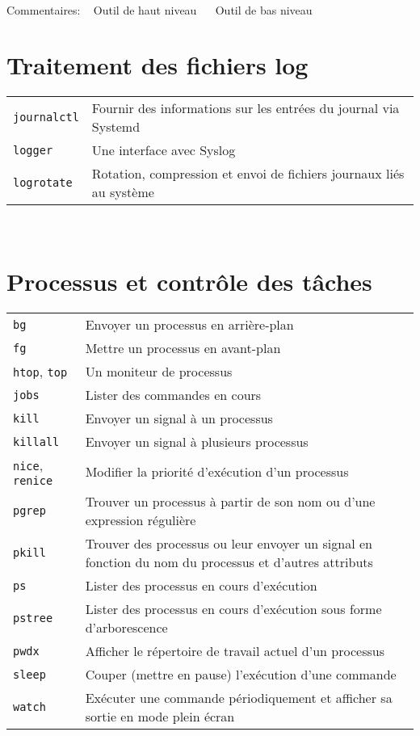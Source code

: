 \documentclass[10pt,a4paper]{article}
\begin{document}
\begin{multicols}{2}
~ \\
\noindent Commentaires: ~ Outil de haut niveau ~ ~Outil de bas niveau

\end{multicols}

\newpage

\cheatsheet

\begin{multicols}{2}   

\section{Traitement des fichiers log}
\begin{tabular}{ p{2.5cm} p{8.5cm} }
  \hline
  \texttt{journalctl} & Fournir des informations sur les entrées du journal via Systemd \\
  \texttt{logger} & Une interface avec Syslog \\
  \texttt{logrotate} & Rotation, compression et envoi de fichiers journaux liés au système \\
  \hline
\end{tabular}

~ \\
\vfill

\section{Processus et contrôle des tâches}
\begin{tabular}{ p{2.5cm} p{8.5cm} }
  \hline
  \texttt{bg} & Envoyer un processus en arrière-plan \\
  \texttt{fg} & Mettre un processus en avant-plan \\
  \texttt{htop}, \texttt{top} & Un moniteur de processus \\
  \texttt{jobs} & Lister des commandes en cours \\
  \texttt{kill} & Envoyer un signal à un processus \\
  \texttt{killall} & Envoyer un signal à plusieurs processus\\
  \texttt{nice}, \texttt{renice} & Modifier la priorité d'exécution d'un processus \\
  \texttt{pgrep} & Trouver un processus à partir de son nom ou d'une expression régulière \\
  \texttt{pkill} & Trouver des processus ou leur envoyer un signal en fonction du nom du processus et d'autres attributs\\
  \texttt{ps} & Lister des processus en cours d'exécution \\
  \texttt{pstree} & Lister des processus en cours d'exécution sous forme d'arborescence \\
  \texttt{pwdx} & Afficher le répertoire de travail actuel d'un processus \\
  \texttt{sleep} & Couper (mettre en pause) l'exécution d'une commande\\
  \texttt{watch} & Exécuter une commande périodiquement et afficher sa sortie en mode plein écran \\
  \hline
\end{tabular}


\end{multicols}
\end{document}
